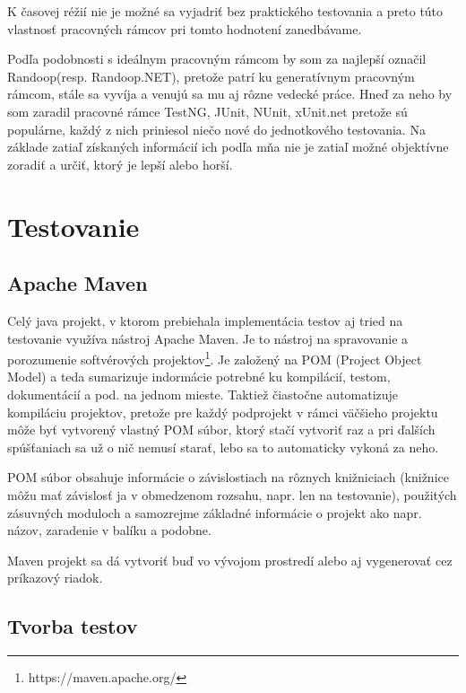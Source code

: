 \documentclass[11pt,twoside,slovak,a4paper]{article}
\begin{document}
	K časovej réžií nie je možné sa vyjadriť bez praktického testovania a preto túto vlastnosť pracovných rámcov pri tomto hodnotení zanedbávame.
	
	Podľa podobnosti s ideálnym pracovným rámcom by som za najlepší označil Randoop(resp. Randoop.NET), pretože patrí ku generatívnym pracovným rámcom, stále sa vyvíja a venujú sa mu aj rôzne vedecké práce. Hneď za neho by som zaradil pracovné rámce TestNG, JUnit, NUnit, xUnit.net pretože sú populárne, každý z nich priniesol niečo nové do jednotkového testovania. Na základe zatiaľ získaných informácií ich podľa mňa nie je zatiaľ možné objektívne zoradiť a určiť, ktorý je lepší alebo horší.
	
	\newpage
	
	\section{Testovanie}
	
	\subsection{Apache Maven}
	
	Celý java projekt, v ktorom prebiehala implementácia testov aj tried na testovanie využíva nástroj Apache Maven. Je to nástroj na spravovanie a porozumenie softvérových projektov\footnote{https://maven.apache.org/}. Je založený na POM (Project Object Model) a teda sumarizuje indormácie potrebné ku kompilácií, testom, dokumentácií a pod. na jednom mieste. Taktiež čiastočne automatizuje kompiláciu projektov, pretože pre každý podprojekt v rámci väčšieho projektu môže byť vytvorený vlastný POM súbor, ktorý stačí vytvoriť raz a pri ďalších spúšťaniach sa už o nič nemusí starať, lebo sa to automaticky vykoná za neho.
	
	POM súbor obsahuje informácie o závislostiach na rôznych knižniciach (knižnice môžu mať závislosť ja v obmedzenom rozsahu, napr. len na testovanie), použitých zásuvných moduloch a samozrejme základné informácie o projekt ako napr. názov, zaradenie v balíku a podobne.
	
	Maven projekt sa dá vytvoriť buď vo vývojom prostredí alebo aj vygenerovať cez príkazový riadok.
	
	\subsection{Tvorba testov}
	
\end{document}
